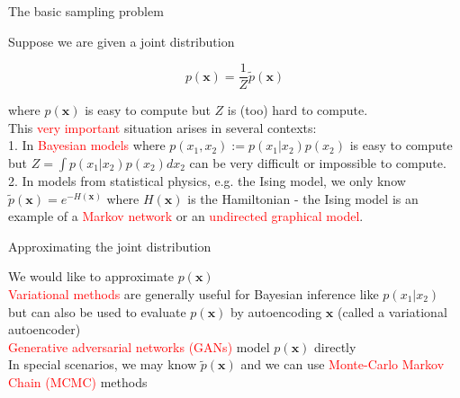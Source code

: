 \documentclass{beamer}					%
\begin{document}
\begin{frame}{The basic sampling problem}

Suppose we are given a joint distribution

\begin{equation*}
p(\mathbf{x}) = \frac{1}{Z}\tilde{p}(\mathbf{x})
\end{equation*}

where $p(\mathbf{x})$ is easy to compute but $Z$ is (too) hard to compute.\\
\vspace{0.1in}
This \textcolor{red}{very important} situation arises in several contexts:\\
\vspace{0.1in}
1. In \textcolor{red}{Bayesian models} where $p(x_{1},x_{2}) := p(x_{1}|x_{2})p(x_{2})$ is easy to compute but
$Z = \int p(x_{1}|x_{2})p(x_{2})dx_{2}$ can be very difficult or impossible to
compute.\\
\vspace{0.1in}
2. In models from statistical physics, e.g. the Ising model, we only know
$\tilde{p}(\mathbf{x}) = e^{−H(\mathbf{x})}$ where $H(\mathbf{x})$ is the Hamiltonian
- the Ising model is an example of a \textcolor{red}{Markov network} or an \textcolor{red}{undirected graphical model}.

\end{frame}

\begin{frame}{Approximating the joint distribution}

We would like to approximate $p(\mathbf{x})$\\
\vspace{0.1in}
\textcolor{red}{Variational methods} are generally useful for Bayesian inference like $p(x_{1}|x_{2})$ but can also be used to evaluate $p(\mathbf{x})$ by autoencoding $\mathbf{x}$ (called a variational autoencoder)\\
\vspace{0.1in}
\textcolor{red}{Generative adversarial networks (GANs)} model $p(\mathbf{x})$ directly\\
\vspace{0.1in}
In special scenarios, we may know $\tilde{p}(\mathbf{x})$ and we can use \textcolor{red}{Monte-Carlo Markov Chain (MCMC)} methods

\end{frame}
\end{document}
